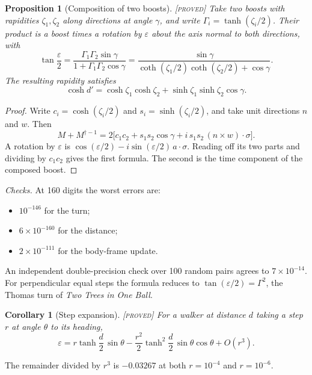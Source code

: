 \documentclass[11pt]{article}
\newtheorem{proposition}{Proposition}
\newtheorem{corollary}{Corollary}
\theoremstyle{definition}
\theoremstyle{remark}
\newcommand{\grade}[1]{\textsc{[#1]}}
\begin{document}
\begin{proposition}[Composition of two boosts] \grade{proved}
Take two boosts with rapidities $\zeta_1,\zeta_2$ along directions at angle $\gamma$, and write $\Gamma_i=\tanh(\zeta_i/2)$. Their product is a boost times a rotation by $\varepsilon$ about the axis normal to both directions, with
\[
\tan\frac{\varepsilon}{2}=\frac{\Gamma_1\Gamma_2\sin\gamma}{1+\Gamma_1\Gamma_2\cos\gamma}
=\frac{\sin\gamma}{\coth(\zeta_1/2)\coth(\zeta_2/2)+\cos\gamma}.
\]
The resulting rapidity satisfies
\[
\cosh d'=\cosh\zeta_1\cosh\zeta_2+\sinh\zeta_1\sinh\zeta_2\cos\gamma .
\]
\end{proposition}
\begin{proof}
Write $c_i=\cosh(\zeta_i/2)$ and $s_i=\sinh(\zeta_i/2)$, and take unit directions $n$ and $w$. Then
\[
M+M^{\dagger-1}=2\bigl[c_1c_2+s_1s_2\cos\gamma+i\,s_1s_2\,(n\times w)\cdot\sigma\bigr].
\]
A rotation by $\varepsilon$ is $\cos(\varepsilon/2)-i\sin(\varepsilon/2)\,a\cdot\sigma$. Reading off its two parts and dividing by $c_1c_2$ gives the first formula. The second is the time component of the composed boost.
\end{proof}

\noindent\emph{Checks.} At 160 digits the worst errors are:
\begin{itemize}
\item $10^{-146}$ for the turn;
\item $6\times10^{-160}$ for the distance;
\item $2\times10^{-111}$ for the body-frame update.
\end{itemize}
An independent double-precision check over 100 random pairs agrees to $7\times10^{-14}$. For perpendicular equal steps the formula reduces to $\tan(\varepsilon/2)=\Gamma^2$, the Thomas turn of \emph{Two Trees in One Ball}.

\begin{corollary}[Step expansion] \grade{proved}
For a walker at distance $d$ taking a step $r$ at angle $\theta$ to its heading,
\[
\varepsilon=r\tanh\frac d2\,\sin\theta-\frac{r^2}{2}\tanh^2\frac d2\,\sin\theta\cos\theta+O(r^3).
\]
\end{corollary}
\noindent The remainder divided by $r^3$ is $-0.03267$ at both $r=10^{-4}$ and $r=10^{-6}$.
\end{document}
